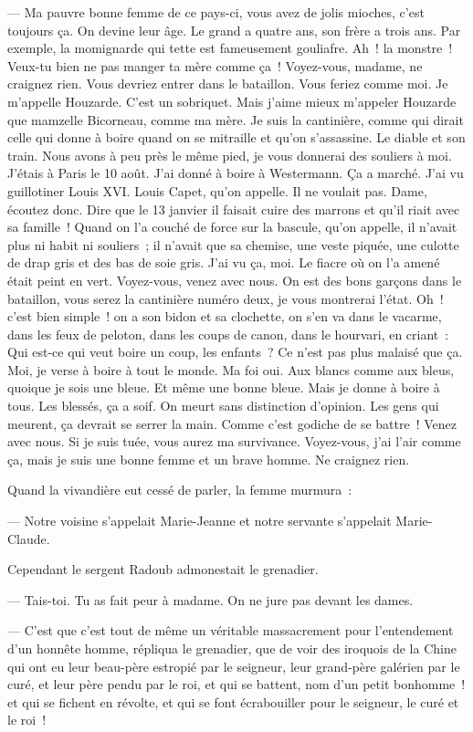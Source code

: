 \documentclass[french,twoside]{book} %
\begin{document}
— Ma pauvre bonne femme de ce pays-ci, vous avez de jolis mioches, c’est toujours ça. On devine leur âge. Le grand a quatre ans, son frère a trois ans. Par exemple, la momignarde qui tette est fameusement gouliafre. Ah ! la monstre ! Veux-tu bien ne pas manger ta mère comme ça ! Voyez-vous, madame, ne craignez rien. Vous devriez entrer dans le bataillon. Vous feriez comme moi. Je m’appelle Houzarde. C’est un sobriquet. Mais j’aime mieux m’appeler Houzarde que mamzelle Bicorneau, comme ma mère. Je suis la cantinière, comme qui dirait celle qui donne à boire quand on se mitraille et qu’on s’assassine. Le diable et son train. Nous avons à peu près le même pied, je vous donnerai des souliers à moi. J’étais à Paris le 10 août. J’ai donné à boire à Westermann. Ça a marché. J’ai vu guillotiner Louis XVI. Louis Capet, qu’on  appelle. Il ne voulait pas. Dame, écoutez donc. Dire que le 13 janvier il faisait cuire des marrons et qu’il riait avec sa famille ! Quand on l’a couché de force sur la bascule, qu’on appelle, il n’avait plus ni habit ni souliers ; il n’avait que sa chemise, une veste piquée, une culotte de drap gris et des bas de soie gris. J’ai vu ça, moi. Le fiacre où on l’a amené était peint en vert. Voyez-vous, venez avec nous. On est des bons garçons dans le bataillon, vous serez la cantinière numéro deux, je vous montrerai l’état. Oh ! c’est bien simple ! on a son bidon et sa clochette, on s’en va dans le vacarme, dans les feux de peloton, dans les coups de canon, dans le hourvari, en criant : Qui est-ce qui veut boire un coup, les enfants ? Ce n’est pas plus malaisé que ça. Moi, je verse à boire à tout le monde. Ma foi oui. Aux blancs comme aux bleus, quoique je sois une bleue. Et même une bonne bleue. Mais je donne à boire à tous. Les blessés, ça a soif. On meurt sans distinction d’opinion. Les gens qui meurent, ça devrait se serrer la main. Comme c’est godiche de se battre ! Venez avec nous. Si je suis tuée, vous aurez ma survivance. Voyez-vous, j’ai l’air comme ça, mais je suis une bonne femme et un brave homme. Ne craignez rien.\par
Quand la vivandière eut cessé de parler, la femme murmura :\par
— Notre voisine s’appelait Marie-Jeanne et notre servante s’appelait Marie-Claude.\par
Cependant le sergent Radoub admonestait le grenadier.\par
 — Tais-toi. Tu as fait peur à madame. On ne jure pas devant les dames.\par
— C’est que c’est tout de même un véritable massacrement pour l’entendement d’un honnête homme, répliqua le grenadier, que de voir des iroquois de la Chine qui ont eu leur beau-père estropié par le seigneur, leur grand-père galérien par le curé, et leur père pendu par le roi, et qui se battent, nom d’un petit bonhomme ! et qui se fichent en révolte, et qui se font écrabouiller pour le seigneur, le curé et le roi !\par
\end{document}
